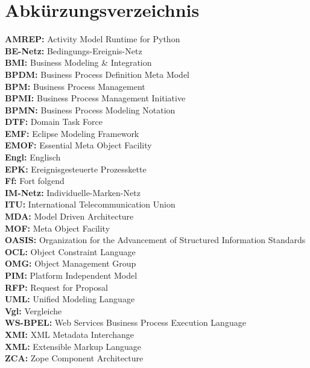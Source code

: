\section*{Abkürzungsverzeichnis}

\textbf{AMREP:} Activity Model Runtime for Python\\
\textbf{BE-Netz:} Bedingungs-Ereignis-Netz\\
\textbf{BMI:} Business Modeling \& Integration\\
\textbf{BPDM:} Business Process Definition Meta Model\\
\textbf{BPM:} Business Process Management\\
\textbf{BPMI:} Business Process Management Initiative\\
\textbf{BPMN:} Business Process Modeling Notation\\
\textbf{DTF:} Domain Task Force\\
\textbf{EMF:} Eclipse Modeling Framework\\
\textbf{EMOF:} Essential Meta Object Facility\\
\textbf{Engl:} Englisch\\
\textbf{EPK:} Ereignisgesteuerte Prozesskette\\
\textbf{Ff:} Fort folgend\\
\textbf{IM-Netz:} Individuelle-Marken-Netz\\
\textbf{ITU:} International Telecommunication Union\\
\textbf{MDA:} Model Driven Architecture\\
\textbf{MOF:} Meta Object Facility\\
\textbf{OASIS:} Organization for the Advancement of Structured Information Standards\\
\textbf{OCL:} Object Constraint Language\\
\textbf{OMG:} Object Management Group\\
\textbf{PIM:} Platform Independent Model\\
\textbf{RFP:} Request for Proposal\\
\textbf{UML:} Unified Modeling Language\\
\textbf{Vgl:} Vergleiche\\
\textbf{WS-BPEL:} Web Services Business Process Execution Language\\
\textbf{XMI:} XML Metadata Interchange\\
\textbf{XML:} Extensible Markup Language\\
\textbf{ZCA:} Zope Component Architecture\\
